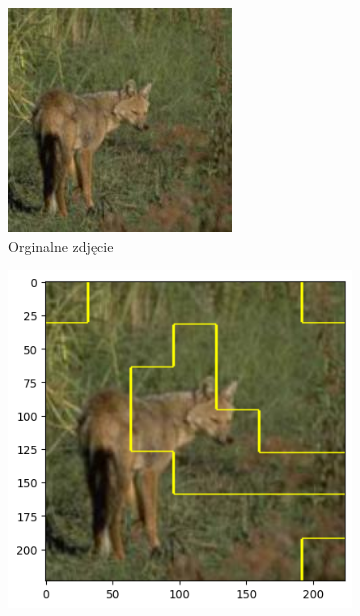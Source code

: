 \begin{figure}[h]
	\centering
	\begin{subfigure}[b]{0.3\textwidth}
		\includegraphics[width=.9\textwidth]{img/examples/appendix/n02114712_40677}
		\caption{Orginalne zdjęcie}  \label{}
	\end{subfigure}
	\begin{subfigure}[b]{0.3\textwidth}
		\centering\includegraphics[width=.9\textwidth]{img/examples/appendix/n02114712_40677_gradcam}

\end{subfigure}
\end{figure}
